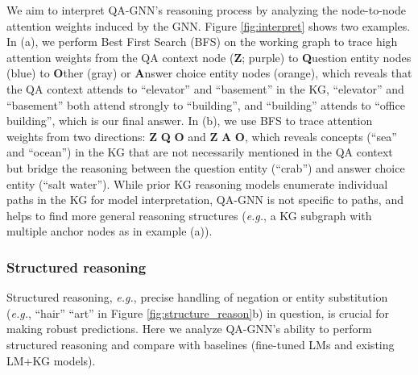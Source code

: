 \documentclass[11pt]{article}
\newcommand{\eg}{\textit{e.g.}}
\newcommand{\methodname}{QA-GNN\xspace}
\begin{document}
We aim to interpret \methodname's reasoning process by analyzing the node-to-node attention weights induced by the GNN. 
Figure \ref{fig:interpret} shows two examples. In (a), we perform Best First Search (BFS) on the working graph to trace high attention weights from the QA context node (\textbf{Z}; purple) to \textbf{Q}uestion entity nodes (blue) to \textbf{O}ther (gray) or \textbf{A}nswer choice entity nodes (orange), which reveals that the QA context  attends to ``elevator'' and ``basement'' in the KG, ``elevator'' and ``basement'' both attend strongly to ``building'', and ``building'' attends to ``office building'', which is our final answer. 
In (b), we use BFS to trace attention weights from two directions: 
\textbf{Z}  \textbf{Q}  \textbf{O} and \textbf{Z}  \textbf{A}  \textbf{O}, which reveals concepts (``sea'' and ``ocean'') in the KG that are not necessarily mentioned in the QA context but bridge the reasoning between the question entity (``crab'') and answer choice entity (``salt water'').
While prior KG reasoning models \cite{lin2019kagnet,feng2020scalable} enumerate individual paths in the KG for model interpretation, \methodname is not specific to paths, and helps to find more general reasoning structures (\eg, a KG subgraph with multiple anchor nodes as in example (a)).





\subsubsection{Structured reasoning}
Structured reasoning, \eg, precise handling of negation or entity substitution (\eg, ``hair''  ``art'' in Figure \!\ref{fig:structure_reason}b) in question, is crucial for making robust predictions. Here we analyze \methodname's ability to perform structured reasoning and compare with baselines (fine-tuned LMs and existing LM+KG models).
\end{document}
